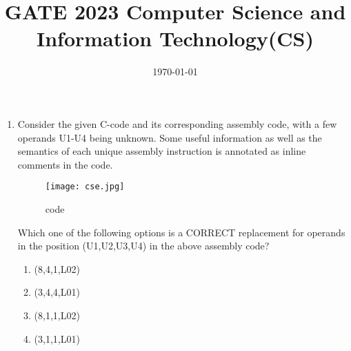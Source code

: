 \documentclass[12pt]{article}
\begin{document}
\title{\textbf{GATE 2023 Computer Science and Information Technology(CS)}}     
\date{\today}   
\maketitle 
\begin{enumerate} 
\item Consider the given C-code and its corresponding assembly code, with a few operands U1-U4 being unknown. Some useful information as well as the semantics of each unique assembly instruction is annotated as inline comments in the code.  
\begin{figure}[!ht]
\texttt{[image: cse.jpg]} 
\caption{code}                           
\label{fig:code}
\end{figure}
Which one of the following options is a CORRECT replacement for operands in the position (U1,U2,U3,U4) in the above assembly code?              
\begin{enumerate}
\item (8,4,1,L02)                      
\item (3,4,4,L01)
\item (8,1,1,L02)                             
\item (3,1,1,L01)         
\end{enumerate}            
\end{enumerate}                             
\end{document}
